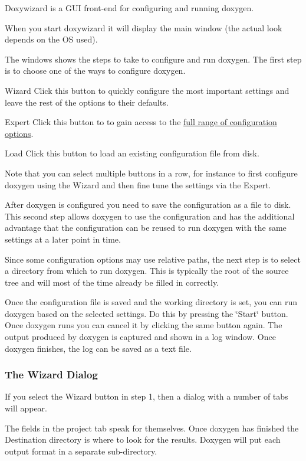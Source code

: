 Doxywizard is a GUI front-\/end for configuring and running doxygen.

When you start doxywizard it will display the main window (the actual look depends on the OS used).

 The windows shows the steps to take to configure and run doxygen. The first step is to choose one of the ways to configure doxygen. 
\begin{DoxyDescription}
\item[Wizard]Click this button to quickly configure the most important settings and leave the rest of the options to their defaults. 
\item[Expert]Click this button to to gain access to the \hyperlink{config}{full range of configuration options}. 
\item[Load]Click this button to load an existing configuration file from disk. 
\end{DoxyDescription}Note that you can select multiple buttons in a row, for instance to first configure doxygen using the Wizard and then fine tune the settings via the Expert.

After doxygen is configured you need to save the configuration as a file to disk. This second step allows doxygen to use the configuration and has the additional advantage that the configuration can be reused to run doxygen with the same settings at a later point in time.

Since some configuration options may use relative paths, the next step is to select a directory from which to run doxygen. This is typically the root of the source tree and will most of the time already be filled in correctly.

Once the configuration file is saved and the working directory is set, you can run doxygen based on the selected settings. Do this by pressing the \char`\"{}Start\char`\"{} button. Once doxygen runs you can cancel it by clicking the same button again. The output produced by doxygen is captured and shown in a log window. Once doxygen finishes, the log can be saved as a text file.

\subsubsection*{The Wizard Dialog}

If you select the Wizard button in step 1, then a dialog with a number of tabs will appear.

 The fields in the project tab speak for themselves. Once doxygen has finished the Destination directory is where to look for the results. Doxygen will put each output format in a separate sub-\/directory.

